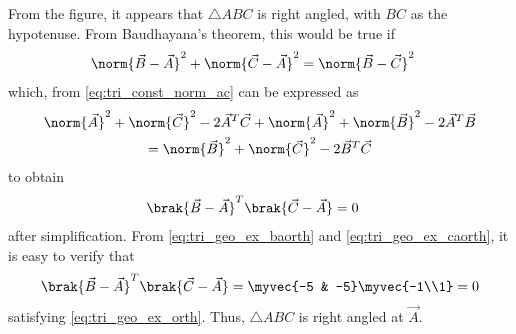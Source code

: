 \begin{enumerate}[label=\arabic*.,ref=\thesubsection.\theenumi]
\begin{figure}[!ht]
\caption{}
\label{fig:check_tri}
\end{figure}
%
From the figure, it appears that $\triangle ABC$ is right angled, with $BC$ as the hypotenuse.  From Baudhayana's theorem, this would be true if 
\begin{align}
\norm{\vec{B}-\vec{A}}^2+\norm{\vec{C}-\vec{A}}^2&=\norm{\vec{B}-\vec{C}}^2
\end{align}
which, from \eqref{eq:tri_const_norm_ac} can be expressed as
\begin{multline}
\norm{\vec{A}}^2 + \norm{\vec{C}}^2 - 2\vec{A}^T\vec{C}+
\norm{\vec{A}}^2 + \norm{\vec{B}}^2 - 2\vec{A}^T\vec{B}
\\
=
\norm{\vec{B}}^2 + \norm{\vec{C}}^2 - 2\vec{B}^T\vec{C}
\end{multline}
%
to obtain 
\begin{align}
\label{eq:tri_geo_ex_orth}
\brak{\vec{B}-\vec{A}}^T\brak{\vec{C}-\vec{A}}&=0
\end{align}
%
after simplification.  From \eqref{eq:tri_geo_ex_baorth} and \eqref{eq:tri_geo_ex_caorth}, it is easy to verify that 
\begin{align}
\label{eq:tri_geo_ex_orth_sol}
\brak{\vec{B}-\vec{A}}^T\brak{\vec{C}-\vec{A}}=
 \myvec{-5 & -5}\myvec{-1\\1} = 0
\end{align}
satisfying
\eqref{eq:tri_geo_ex_orth}. Thus,  $\triangle ABC$ is right angled at $\vec{A}$.
%
%


\end{enumerate}
